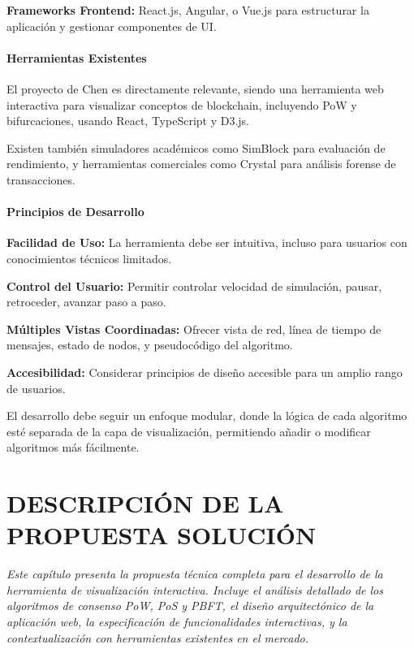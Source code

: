 \documentclass[spanish,12pt,letterpaper]{report}
\begin{document}
\textbf{Frameworks Frontend:} React.js, Angular, o Vue.js para estructurar la aplicación y gestionar componentes de UI.

\subsubsection{Herramientas Existentes}

El proyecto de Chen \parencite{chen2024blockchain} es directamente relevante, siendo una herramienta web interactiva para visualizar conceptos de blockchain, incluyendo PoW y bifurcaciones, usando React, TypeScript y D3.js.

Existen también simuladores académicos como SimBlock para evaluación de rendimiento, y herramientas comerciales como Crystal para análisis forense de transacciones.

\subsubsection{Principios de Desarrollo}

\textbf{Facilidad de Uso:} La herramienta debe ser intuitiva, incluso para usuarios con conocimientos técnicos limitados.

\textbf{Control del Usuario:} Permitir controlar velocidad de simulación, pausar, retroceder, avanzar paso a paso.

\textbf{Múltiples Vistas Coordinadas:} Ofrecer vista de red, línea de tiempo de mensajes, estado de nodos, y pseudocódigo del algoritmo.

\textbf{Accesibilidad:} Considerar principios de diseño accesible para un amplio rango de usuarios.

El desarrollo debe seguir un enfoque modular, donde la lógica de cada algoritmo esté separada de la capa de visualización, permitiendo añadir o modificar algoritmos más fácilmente.


\chapter{DESCRIPCIÓN DE LA PROPUESTA SOLUCIÓN}

\textit{Este capítulo presenta la propuesta técnica completa para el desarrollo de la herramienta de visualización interactiva. Incluye el análisis detallado de los algoritmos de consenso PoW, PoS y PBFT, el diseño arquitectónico de la aplicación web, la especificación de funcionalidades interactivas, y la contextualización con herramientas existentes en el mercado.}
\end{document}
